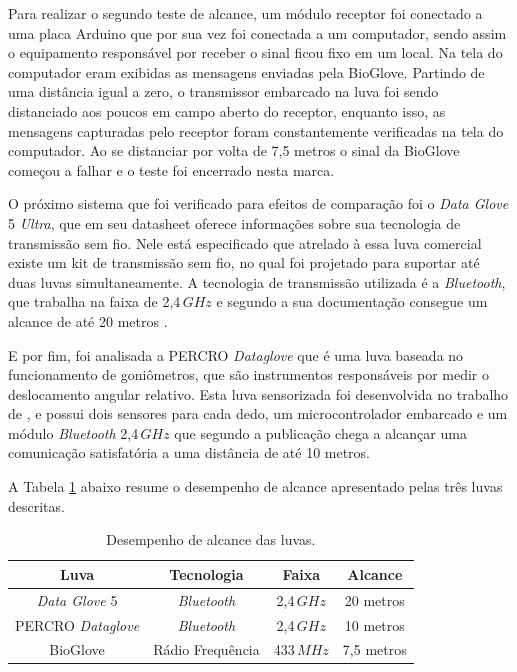 \documentclass[
	12pt,				%
	openright,			%
	oneside,			%
	a4paper,			%
	english,			%
	brazil				%
	]{abntex2}
\begin{document}
		Para realizar o segundo teste de alcance, um módulo receptor foi conectado a uma placa Arduino que por sua vez foi conectada a um computador, sendo assim o equipamento responsável por receber o sinal ficou fixo em um local. Na tela do computador eram exibidas as mensagens enviadas pela BioGlove. Partindo de uma distância igual a zero, o transmissor embarcado na luva foi sendo distanciado aos poucos em campo aberto do receptor, enquanto isso, as mensagens capturadas pelo receptor foram constantemente verificadas na tela do computador. Ao se distanciar por volta de 7,5 metros o sinal da BioGlove começou a falhar e o teste foi encerrado nesta marca. 

			O próximo sistema que foi verificado para efeitos de comparação foi o \textit{Data Glove} 5 \textit{Ultra}, que em seu datasheet oferece informações sobre sua tecnologia de transmissão sem fio. Nele está especificado que atrelado à essa luva comercial existe um kit de transmissão sem fio, no qual foi projetado para suportar até duas luvas simultaneamente. A tecnologia de transmissão utilizada é a \textit{Bluetooth}, que trabalha na faixa de 2,4$\,GHz$ e segundo a sua documentação consegue um alcance de até 20 metros \cite{5DT-ultra}.

			E por fim, foi analisada a PERCRO \textit{Dataglove} que é uma luva baseada no funcionamento de goniômetros, que são instrumentos responsáveis por medir o deslocamento angular relativo. Esta luva sensorizada foi desenvolvida no trabalho de \cite{rodriguez2007goniometric}, e possui dois sensores para cada dedo, um microcontrolador embarcado e um módulo \textit{Bluetooth} 2,4$\,GHz$ que segundo a publicação chega a alcançar uma comunicação satisfatória a uma distância de até 10 metros.


			A Tabela \ref{Tab:wifi-range} abaixo resume o desempenho de alcance apresentado pelas três luvas descritas.

		\begin{table}[H]
  	\centering
		\caption{Desempenho de alcance das luvas.}
    \begin{tabular}{c|c|c|c}
      \midrule
			Luva 						& Tecnologia			&	Faixa		& Alcance		\\
      \midrule                                            					
			\textit{Data Glove} 5			& \textit{Bluetooth}				& 2,4$\,GHz$	& 20 metros	\\
			PERCRO \textit{Dataglove}	& \textit{Bluetooth}				& 2,4$\,GHz$	& 10 metros	\\
			BioGlove				& Rádio Frequência& 433$\,MHz$	&	7,5 metros\\	
      \midrule
    \end{tabular}
		\label{Tab:wifi-range}
		\end{table}
\end{document}
